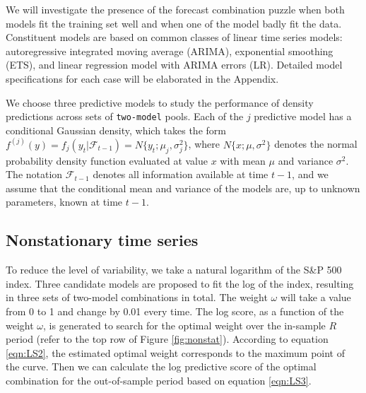 \documentclass{monashthesis}
\begin{document}
We will investigate the presence of the forecast combination puzzle when both models fit the training set well and when one of the model badly fit the data. Constituent models are based on common classes of linear time series models: autoregressive integrated moving average (ARIMA), exponential smoothing (ETS), and linear regression model with ARIMA errors (LR). Detailed model specifications for each case will be elaborated in the Appendix.

We choose three predictive models to study the performance of density predictions across sets of \texttt{two-model} pools. Each of the \(j\) predictive model has a conditional Gaussian density, which takes the form \(f^{(j)}(y)=f_j(y_t|\mathcal{F}_{t-1})=N\{y_t; \mu_j, \sigma^2_j\}\), where \(N\{x; \mu, \sigma^2\}\) denotes the normal probability density function evaluated at value \(x\) with mean \(\mu\) and variance \(\sigma^2\). The notation \(\mathcal{F}_{t-1}\) denotes all information available at time \(t-1\), and we assume that the conditional mean and variance of the models are, up to unknown parameters, known at time \(t-1\).

\hypertarget{nonstationary-time-series}{%
\subsection{Nonstationary time series}\label{nonstationary-time-series}}

To reduce the level of variability, we take a natural logarithm of the S\&P 500 index. Three candidate models are proposed to fit the log of the index, resulting in three sets of two-model combinations in total. The weight \(\omega\) will take a value from 0 to 1 and change by 0.01 every time. The log score, as a function of the weight \(\omega\), is generated to search for the optimal weight over the in-sample \(R\) period (refer to the top row of Figure \ref{fig:nonstat}). According to equation \ref{eqn:LS2}, the estimated optimal weight corresponds to the maximum point of the curve. Then we can calculate the log predictive score of the optimal combination for the out-of-sample period based on equation \ref{eqn:LS3}.
\end{document}
